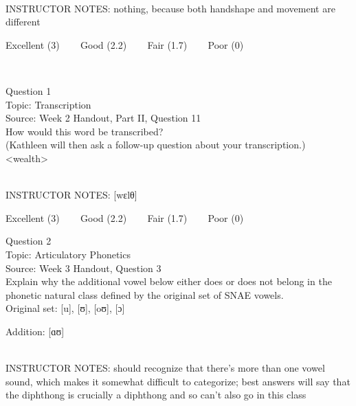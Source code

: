 \documentclass[12pt]{article}
\begin{document}
~\\
INSTRUCTOR NOTES: nothing, because both handshape and movement are different


\vfill
Excellent (3) ~~~ Good (2.2) ~~~ Fair (1.7) ~~~ Poor (0)
\newpage

\begin{center}
\textbf{{\color{red}{\HUGE END OF EXAM}}}\\

\end{center}
\newpage

\begin{center}
\textbf{{\color{blue}{\HUGE START OF EXAM\\}}}

\textbf{{\color{blue}{\HUGE Student ID: 43672\\}}}

\textbf{{\color{blue}{\HUGE \\}}}

\end{center}
\newpage

{\large Question 1}\\

Topic: Transcription\\
Source: Week 2 Handout, Part II, Question 11\\

How would this word be transcribed?\\ (Kathleen will then ask a follow-up question about your transcription.)\\

<wealth>


~\\
INSTRUCTOR NOTES: [wɛlθ]


\vfill
Excellent (3) ~~~ Good (2.2) ~~~ Fair (1.7) ~~~ Poor (0)
\newpage

{\large Question 2}\\

Topic: Articulatory Phonetics\\
Source: Week 3 Handout, Question 3\\

Explain why the additional vowel below either does or does not belong in the phonetic natural class defined by the original set of SNAE vowels.\\

Original set: {[u]}, {[ʊ]}, {[oʊ]}, {[ɔ]}

Addition: {[ɑʊ]}


~\\
INSTRUCTOR NOTES: should recognize that there's more than one vowel sound, which makes it somewhat difficult to categorize; best answers will say that the diphthong is crucially a diphthong and so can't also go in this class
\end{document}
